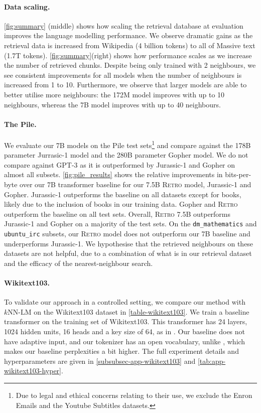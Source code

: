 \paragraph{Data scaling.} \autoref{fig:summary} (middle) shows how scaling the retrieval database at evaluation improves the language modelling performance. We observe dramatic gains as the retrieval data is increased from Wikipedia (4 billion tokens) to all of Massive text (1.7T tokens).
\autoref{fig:summary}(right) shows how performance scales as we increase the number of retrieved chunks. Despite being only trained with 2 neighbours, we see consistent improvements for all models when the number of neighbours is increased from 1 to 10. Furthermore, we observe that larger models are able to better utilise more neighbours: the 172M model improves with up to 10 neighbours, whereas the 7B model improves with up to 40 neighbours.

\paragraph{The Pile.} We evaluate our 7B models on the Pile test sets\footnote{Due to legal and ethical concerns relating to their use, we exclude the Enron Emails and the Youtube Subtitles datasets.} and compare against the 178B parameter Jurrasic-1 \citep{jurassic} model and the 280B parameter Gopher \citep{rae2021gopher} model. We do not compare against GPT-3 as it is outperformed by Jurassic-1 and Gopher on almost all subsets.
\autoref{fig:pile_results} shows the relative improvements in bits-per-byte over our 7B transformer baseline for our 7.5B \textsc{Retro} model, Jurassic-1 and Gopher. Jurassic-1 outperforms the baseline on all datasets except for books, likely due to the inclusion of books in our training data. Gopher and \textsc{Retro} outperform the baseline on all test sets. Overall, \textsc{Retro} 7.5B outperforms Jurassic-1 and Gopher on a majority of the test sets. On the \texttt{dm\_mathematics} and \texttt{ubuntu\_irc} subsets, our \textsc{Retro} model does not outperform our 7B baseline and underperforms Jurassic-1. We hypothesise that the retrieved neighbours on these datasets are not helpful, due to a combination of what is in our retrieval dataset and the efficacy of the nearest-neighbour search.

\paragraph{Wikitext103.} To validate our approach in a controlled setting, we compare our method with $k\textrm{NN-LM}$ \citep{khandelwal2020generalization} on the Wikitext103 dataset in \autoref{table-wikitext103}. 
We train a baseline transformer on the training set of Wikitext103. This transformer has 24 layers, 1024 hidden units, 16 heads and a key size of 64, as in \cite{baevski2019adaptive}. Our baseline does not have adaptive input, and our tokenizer has an open vocabulary, unlike \cite{baevski2019adaptive}, which makes our baseline perplexities a bit higher. The full experiment details and hyperparameters are given in \autoref{subsubsec-app-wikitext103} and \autoref{tab:app-wikitext103-hyper}.

